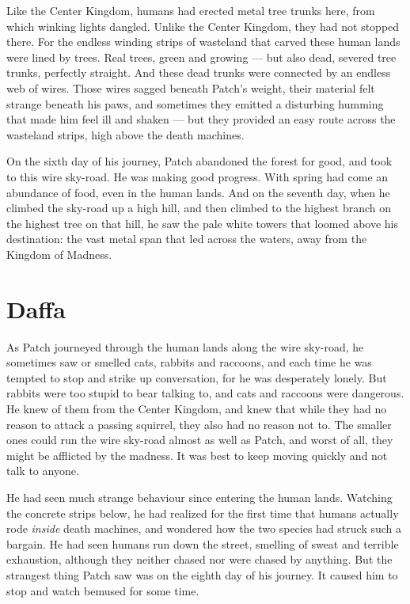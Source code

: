 \documentclass[12pt]{memoir}
\begin{document}
Like the Center Kingdom, humans had erected metal tree trunks here,
from which winking lights dangled. Unlike the Center Kingdom, they had
not stopped there. For the endless winding strips of wasteland that
carved these human lands were lined by trees. Real trees, green and
growing — but also dead, severed tree trunks, perfectly straight. And
these dead trunks were connected by an endless web of wires. Those
wires sagged beneath Patch’s weight, their material felt strange
beneath his paws, and sometimes they emitted a disturbing humming that
made him feel ill and shaken — but they provided an easy route across
the wasteland strips, high above the death machines.

On the sixth day of his journey, Patch abandoned the forest for good,
and took to this wire sky-road. He was making good progress. With
spring had come an abundance of food, even in the human lands. And on
the seventh day, when he climbed the sky-road up a high hill, and then
climbed to the highest branch on the highest tree on that hill, he saw
the pale white towers that loomed above his destination: the vast
metal span that led across the waters, away from the Kingdom of
Madness.


\section{Daffa}

As Patch journeyed through the human lands along the wire sky-road, he
sometimes saw or smelled cats, rabbits and raccoons, and each time he
was tempted to stop and strike up conversation, for he was desperately
lonely. But rabbits were too stupid to bear talking to, and cats and
raccoons were dangerous. He knew of them from the Center Kingdom, and
knew that while they had no reason to attack a passing squirrel, they
also had no reason not to. The smaller ones could run the wire
sky-road almost as well as Patch, and worst of all, they might be
afflicted by the madness. It was best to keep moving quickly and not
talk to anyone.

He had seen much strange behaviour since entering the human
lands. Watching the concrete strips below, he had realized for the
first time that humans actually rode \textit{inside} death machines,
and wondered how the two species had struck such a bargain. He had
seen humans run down the street, smelling of sweat and terrible
exhaustion, although they neither chased nor were chased by
anything. But the strangest thing Patch saw was on the eighth day of
his journey. It caused him to stop and watch bemused for some time.
\end{document}
